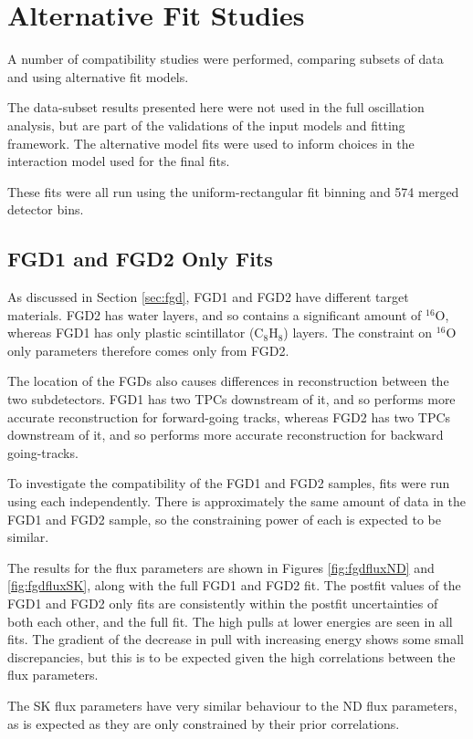\chapter{Alternative Fit Studies}

A number of compatibility studies were performed, comparing subsets of data and using alternative fit models.

The data-subset results presented here were not used in the full oscillation analysis, but are part of the validations of the input models and fitting framework. The alternative model fits were used to inform choices in the interaction model used for the final fits.

These fits were all run using the uniform-rectangular fit binning and 574 merged detector bins.

\section{FGD1 and FGD2 Only Fits}

As discussed in Section \ref{sec:fgd}, FGD1 and FGD2 have different target materials. FGD2 has water layers, and so contains a significant amount of $^{16}$O, whereas FGD1 has only plastic scintillator (C$_8$H$_8$) layers. The constraint on $^{16}$O only parameters therefore comes only from FGD2. 

The location of the FGDs also causes differences in reconstruction between the two subdetectors. FGD1 has two TPCs downstream of it, and so performs more accurate reconstruction for forward-going tracks, whereas FGD2 has two TPCs downstream of it, and so performs more accurate reconstruction for backward going-tracks.

To investigate the compatibility of the FGD1 and FGD2 samples, fits were run using each independently. There is approximately the same amount of data in the FGD1 and FGD2 sample, so the constraining power of each is expected to be similar.

The results for the flux parameters are shown in Figures \ref{fig:fgdfluxND} and \ref{fig:fgdfluxSK}, along with the full FGD1 and FGD2 fit. The postfit values of the FGD1 and FGD2 only fits are consistently within the postfit uncertainties of both each other, and the full fit. The high pulls at lower energies are seen in all fits. The gradient of the decrease in pull with increasing energy shows some small discrepancies, but this is to be expected given the high correlations between the flux parameters.

The SK flux parameters have very similar behaviour to the ND flux parameters, as is expected as they are only constrained by their prior correlations.

